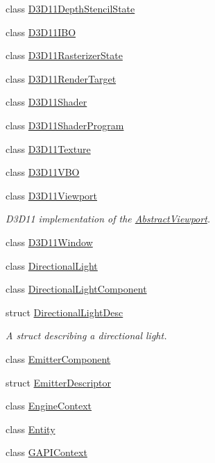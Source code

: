 \begin{DoxyCompactItemize}
class \hyperlink{class_blade_1_1_d3_d11_depth_stencil_state}{D3\+D11\+Depth\+Stencil\+State}
\item 
class \hyperlink{class_blade_1_1_d3_d11_i_b_o}{D3\+D11\+I\+BO}
\item 
class \hyperlink{class_blade_1_1_d3_d11_rasterizer_state}{D3\+D11\+Rasterizer\+State}
\item 
class \hyperlink{class_blade_1_1_d3_d11_render_target}{D3\+D11\+Render\+Target}
\item 
class \hyperlink{class_blade_1_1_d3_d11_shader}{D3\+D11\+Shader}
\item 
class \hyperlink{class_blade_1_1_d3_d11_shader_program}{D3\+D11\+Shader\+Program}
\item 
class \hyperlink{class_blade_1_1_d3_d11_texture}{D3\+D11\+Texture}
\item 
class \hyperlink{class_blade_1_1_d3_d11_v_b_o}{D3\+D11\+V\+BO}
\item 
class \hyperlink{class_blade_1_1_d3_d11_viewport}{D3\+D11\+Viewport}
\begin{DoxyCompactList}\small\item\em D3\+D11 implementation of the \hyperlink{class_blade_1_1_abstract_viewport}{Abstract\+Viewport}. \end{DoxyCompactList}\item 
class \hyperlink{class_blade_1_1_d3_d11_window}{D3\+D11\+Window}
\item 
class \hyperlink{class_blade_1_1_directional_light}{Directional\+Light}
\item 
class \hyperlink{class_blade_1_1_directional_light_component}{Directional\+Light\+Component}
\item 
struct \hyperlink{struct_blade_1_1_directional_light_desc}{Directional\+Light\+Desc}
\begin{DoxyCompactList}\small\item\em A struct describing a directional light. \end{DoxyCompactList}\item 
class \hyperlink{class_blade_1_1_emitter_component}{Emitter\+Component}
\item 
struct \hyperlink{struct_blade_1_1_emitter_descriptor}{Emitter\+Descriptor}
\item 
class \hyperlink{class_blade_1_1_engine_context}{Engine\+Context}
\item 
class \hyperlink{class_blade_1_1_entity}{Entity}
\item 
class \hyperlink{class_blade_1_1_g_a_p_i_context}{G\+A\+P\+I\+Context}

\end{DoxyCompactItemize}
